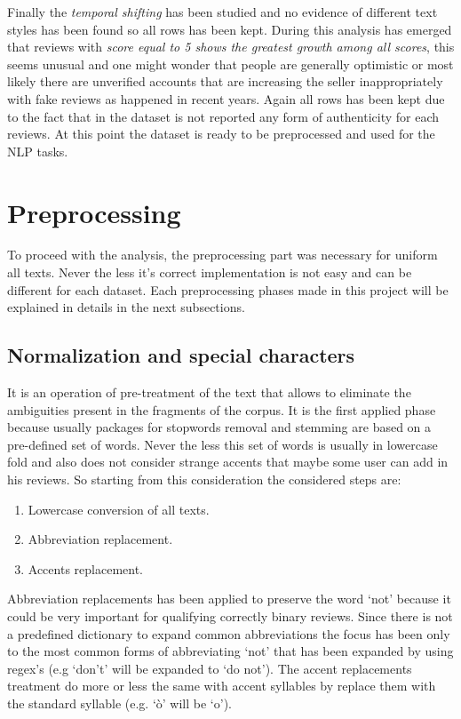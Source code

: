 \documentclass[11pt]{article}
\begin{document}
\noindent Finally the \textit{temporal shifting} has been studied and no evidence of different text styles has been found so all rows has been kept. During this analysis has emerged that reviews with \textit{score equal to 5 shows the greatest growth among all scores}, this seems unusual and one might wonder that people are generally optimistic or most likely there are unverified accounts that are increasing the seller inappropriately with fake reviews as happened in recent years. Again all rows has been kept due to the fact that in the dataset is not reported any form of authenticity for each reviews. At this point the dataset is ready to be preprocessed and used for the NLP tasks.

\section{Preprocessing}
To proceed with the analysis, the preprocessing part was necessary for uniform all texts. Never the less it's correct implementation is not easy and can be different for each dataset. Each preprocessing phases made in this project will be explained in details in the next subsections.

\subsection{Normalization and special characters}
It is an operation of pre-treatment of the text that allows to eliminate the ambiguities present in the fragments of the corpus. It is the first applied phase because usually packages for stopwords removal and stemming are based on a pre-defined set of words. Never the less this set of words is usually in lowercase fold and also does not consider strange accents that maybe some user can add in his reviews. 
So starting from this consideration the considered steps are:
\begin{enumerate}
    \item Lowercase conversion of all texts.
    \item Abbreviation replacement.
    \item Accents replacement.
\end{enumerate}
Abbreviation replacements has been applied to preserve the word `not' because it could be very important for qualifying correctly binary reviews. Since there is not a predefined dictionary to expand common abbreviations the focus has been only to the most common forms of abbreviating `not' that has been expanded by using regex's (e.g `don't' will be expanded to `do not'). The accent replacements treatment do more or less the same with accent syllables by replace them with the standard syllable (e.g. `ò' will be `o').
\end{document}
